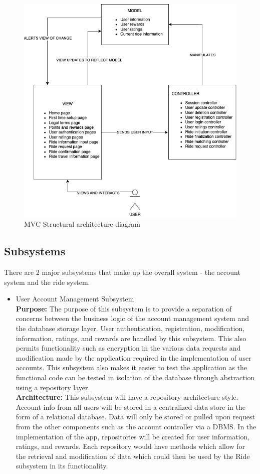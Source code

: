 \documentclass[]{article}
\begin{document}
\begin{figure}[h]
	\centering
	\includegraphics[width=30 em]{assets/3a04_d2_mvc.png}
	\caption{MVC Structural architecture diagram}
	\label{fig:acd}
\end{figure}


\subsection{Subsystems}
\label{sub:subsystems}

There are 2 major subsystems that make up the overall system - the account system and the ride system.

\begin{itemize}
    \item User Account Management Subsystem \\
    \textbf{Purpose:} The purpose of this subsystem is to provide a separation of concerns between the business logic of the account management system and the database storage layer. User authentication, registration, modification, information, ratings, and rewards are handled by this subsystem. This also permits functionality such as encryption in the various data requests and modification made by the application required in the implementation of user accounts. This subsystem also makes it easier to test the application as the functional code can be tested in isolation of the database through abstraction using a repository layer. \\
    \textbf{Architecture:} This subsystem will have a repository architecture style. Account info from all users will be stored in a centralized data store in the form of a relational database. Data will only be stored or pulled upon request from the other components such as the account controller via a DBMS. In the implementation of the app, repositories will be created for user information, ratings, and rewards. Each repository would have methods which allow for the retrieval and modification of data which could then be used by the Ride subsystem in its functionality. 
\end{itemize}
\end{document}
